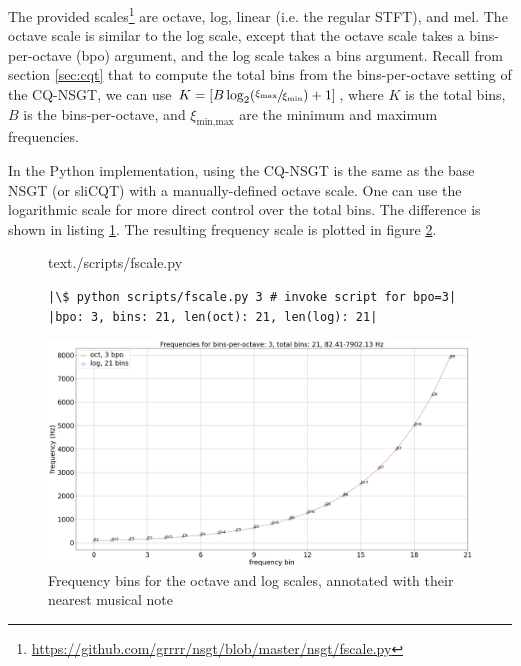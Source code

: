 \documentclass[report.tex]{subfiles}
\begin{document}
The provided scales\footnote{\url{https://github.com/grrrr/nsgt/blob/master/nsgt/fscale.py}} are octave, log, linear (i.e. the regular STFT), and mel. The octave scale is similar to the log scale, except that the octave scale takes a bins-per-octave (bpo) argument, and the log scale takes a bins argument. Recall from section \ref{sec:cqt} that to compute the total bins from the bins-per-octave setting of the CQ-NSGT, we can use $K = [B \log_{2}(\sfrac{\xi_{\text{max}}}{\xi_{\text{min}}}) + 1]$, where $K$ is the total bins, $B$ is the bins-per-octave, and $\xi_{\text{min,max}}$ are the minimum and maximum frequencies.

In the Python implementation, using the CQ-NSGT is the same as the base NSGT (or sliCQT) with a manually-defined octave scale. One can use the logarithmic scale for more direct control over the total bins. The difference is shown in listing \ref{code:octvlog}. The resulting frequency scale is plotted in figure \ref{fig:octvlog}.

\begin{figure}[h]
  \centering
 \begin{minipage}{\textwidth}
  \centering
\setlength\partopsep{-\topsep}
\begin{inputminted}[linenos,breaklines,frame=single,firstline=4,lastline=16]{text}{./scripts/fscale.py}
\end{inputminted}
 \vspace{1em}
 \end{minipage}
 \begin{minipage}{\textwidth}
  \centering
\begin{verbatim}
|\$ python scripts/fscale.py 3 # invoke script for bpo=3|
|bpo: 3, bins: 21, len(oct): 21, len(log): 21|
\end{verbatim}
 \end{minipage}
  \label{code:octvlog}
\end{figure}

\begin{figure}[ht]
	\centering
	\includegraphics[width=\textwidth]{./images-freqscales/log_vs_oct.png}
	\caption{Frequency bins for the octave and log scales, annotated with their nearest musical note}
	\label{fig:octvlog}
\end{figure}
\end{document}
